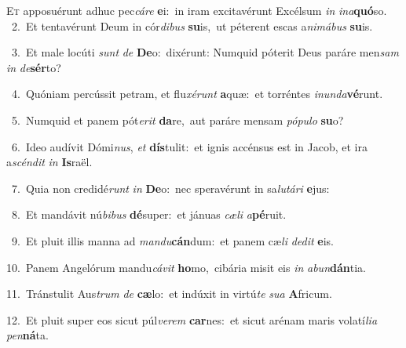 \lettrine{\initial\textcolor{\initialcolor}{E}}{t} apposuérunt adhuc pec\-\textit{cá}\-\textit{re} \textbf{e}\-i:~\star in iram excitavérunt Excélsum \textit{in} \textit{in}\-\textit{a}\textbf{quó}so.\\
{\numbfont\textcolor{\numbcolor}{~2.}}~Et tentavérunt Deum in cór\-\textit{di}\-\textit{bus} \textbf{su}\-is,~\star ut péterent escas a\-\textit{ni}\-\textit{má}\textit{bus} \textbf{su}\-is.\par
{\numbfont\textcolor{\numbcolor}{~3.}}~Et male locúti \textit{sunt} \textit{de} \textbf{De}\-o:~\star dixérunt: Numquid póterit Deus paráre men\textit{sam} \textit{in} \textit{de}\-\textbf{sér}to?\par
{\numbfont\textcolor{\numbcolor}{~4.}}~Quóniam percússit petram, et flu\-\textit{xé}\-\textit{runt} \textbf{a}\-quæ:~\star et torréntes \textit{in}\-\textit{un}\textit{da}\textbf{vé}runt.\par
{\numbfont\textcolor{\numbcolor}{~5.}}~Numquid et panem pót\-\textit{e}\-\textit{rit} \textbf{da}\-re,~\star aut paráre mensam \textit{pó}\-\textit{pu}\textit{lo} \textbf{su}\-o?\par
{\numbfont\textcolor{\numbcolor}{~6.}}~Ideo audívit Dómi\-\textit{nus}\-, \textit{et} \textbf{dís}\-tulit:~\star et ignis accénsus est in Jacob, et ira a\-\textit{scén}\-\textit{dit} \textit{in} \textbf{Is}\-raël.\par
{\numbfont\textcolor{\numbcolor}{~7.}}~Quia non credidé\textit{runt} \textit{in} \textbf{De}\-o:~\star nec speravérunt in sa\-\textit{lu}\-\textit{tá}\textit{ri} \textbf{e}\-jus:\par
{\numbfont\textcolor{\numbcolor}{~8.}}~Et mandávit nú\-\textit{bi}\-\textit{bus} \textbf{dé}\-super:~\star et jánuas \textit{cæ}\-\textit{li} \textit{a}\-\textbf{pé}ruit.\par
{\numbfont\textcolor{\numbcolor}{~9.}}~Et pluit illis manna ad \textit{man}\-\textit{du}\textbf{cán}dum:~\star et panem cæ\textit{li} \textit{de}\-\textit{dit} \textbf{e}\-is.\par
{\numbfont\textcolor{\numbcolor}{10.}}~Panem Angelórum mandu\-\textit{cá}\-\textit{vit} \textbf{ho}\-mo,~\star cibária misit eis \textit{in} \textit{ab}\-\textit{un}\textbf{dán}tia.\par
{\numbfont\textcolor{\numbcolor}{11.}}~Tránstulit Aus\textit{trum} \textit{de} \textbf{cæ}\-lo:~\star et indúxit in virtú\textit{te} \textit{su}\-\textit{a} \textbf{A}\-fricum.\par
{\numbfont\textcolor{\numbcolor}{12.}}~Et pluit super eos sicut púl\-\textit{ve}\-\textit{rem} \textbf{car}\-nes:~\star et sicut arénam maris volatí\-\textit{li}\-\textit{a} \textit{pen}\-\textbf{ná}ta.\par
